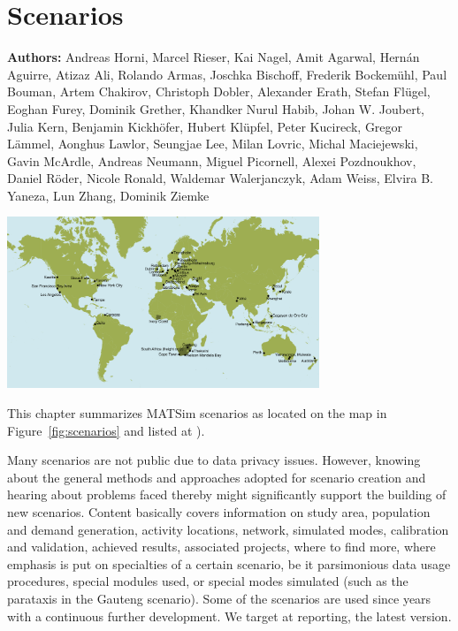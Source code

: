 \chapter{Scenarios}
\label{ch:scenarios}

\hfill \textbf{Authors:} 
Andreas Horni, 
Marcel Rieser, 
Kai Nagel,
Amit Agarwal,
Hernán Aguirre,
Atizaz Ali,
Rolando Armas,
Joschka Bischoff,
Frederik Bockemühl,
Paul Bouman,
Artem Chakirov,
Christoph Dobler,
Alexander Erath,
Stefan Flügel, 
Eoghan Furey,
Dominik Grether,
Khandker Nurul Habib,
Johan W. Joubert,
Julia Kern,
Benjamin Kickhöfer,
Hubert Klüpfel,
Peter Kucireck,
Gregor Lämmel,
Aonghus Lawlor,
Seungjae Lee,
Milan Lovric,
Michal Maciejewski,
Gavin McArdle,
Andreas Neumann,
Miguel Picornell,
Alexei Pozdnoukhov,
Daniel Röder,
Nicole Ronald,
Waldemar Walerjanczyk,
Adam Weiss,
Elvira B. Yaneza,
Lun Zhang,
Dominik Ziemke

\begin{center} \includegraphics[width=0.7\textwidth, angle=0]{using/figures/MATSimModelsMap} \end{center}

This chapter summarizes MATSim scenarios as located on the map in Figure~\ref{fig:scenarios} and listed at \citet[][]{MATSIM-T-Scenarios_Webpage_2014}).

Many scenarios are not public due to data privacy issues. However, knowing about the general methods and approaches adopted for scenario creation and hearing about problems faced thereby might significantly support the building of new scenarios. Content basically covers information on study area, population and demand generation, activity locations, network, simulated modes, calibration and validation, achieved results, associated projects, where to find more, where emphasis is put on specialties of a certain scenario, be it parsimonious data usage procedures, special modules used, or special modes simulated (such as the parataxis in the Gauteng scenario). Some of the scenarios are used since years with a continuous further development. We target at reporting, the latest version. 

